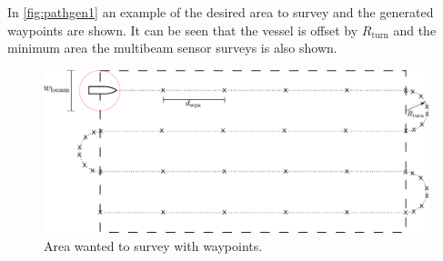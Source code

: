 In \autoref{fig:pathgen1} an example of the desired area to survey and the generated waypoints are shown. It can be seen that the vessel is offset by $R_\mathrm{turn}$ and the minimum area the multibeam sensor surveys is also shown.
%
\begin{figure}[H]
  \includegraphics[width=1\textwidth]{figures/pathGen} 
  \caption{Area wanted to survey with waypoints.}
  \label{fig:pathgen1}
\end{figure}   


